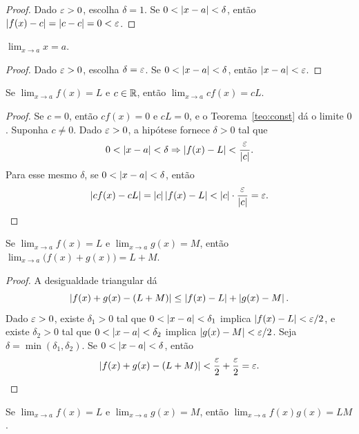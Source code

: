 \documentclass[11pt,a4paper]{article}
\begin{document}
\begin{proof}
Dado $\varepsilon>0$, escolha $\delta=1$. Se $0<\left\lvert x-a \right\rvert<\delta$, ent\~ao $\left\lvert f(x)-c \right\rvert=\left\lvert c-c \right\rvert=0<\varepsilon$.
\end{proof}

\begin{teorema}[Identidade]
\label{teo:id}
$\lim_{x\to a}x=a$.
\end{teorema}

\begin{proof}
Dado $\varepsilon>0$, escolha $\delta=\varepsilon$. Se $0<\left\lvert x-a \right\rvert<\delta$, ent\~ao $\left\lvert x-a \right\rvert<\varepsilon$.
\end{proof}

\begin{teorema}
\label{teo:escalar}
Se $\lim_{x\to a}f(x)=L$ e $c\in\mathbb{R}$, ent\~ao $\lim_{x\to a}cf(x)=cL$.
\end{teorema}

\begin{proof}
Se $c=0$, ent\~ao $cf(x)=0$ e $cL=0$, e o Teorema~\ref{teo:const} d\'a o limite $0$. Suponha $c\neq 0$. Dado $\varepsilon>0$, a hip\'otese fornece $\delta>0$ tal que
\[
0<\left\lvert x-a \right\rvert<\delta \Rightarrow \left\lvert f(x)-L \right\rvert<\frac{\varepsilon}{\left\lvert c \right\rvert}.
\]
Para esse mesmo $\delta$, se $0<\left\lvert x-a \right\rvert<\delta$, ent\~ao
\[
\left\lvert cf(x)-cL \right\rvert=\left\lvert c \right\rvert\left\lvert f(x)-L \right\rvert<\left\lvert c \right\rvert\cdot\frac{\varepsilon}{\left\lvert c \right\rvert}=\varepsilon.
\]
\end{proof}

\begin{teorema}[Soma]
\label{teo:soma}
Se $\lim_{x\to a}f(x)=L$ e $\lim_{x\to a}g(x)=M$, ent\~ao $\lim_{x\to a}\bigl(f(x)+g(x)\bigr)=L+M$.
\end{teorema}

\begin{proof}
A desigualdade triangular d\'a
\[
\left\lvert f(x)+g(x)-(L+M) \right\rvert\le \left\lvert f(x)-L \right\rvert+\left\lvert g(x)-M \right\rvert.
\]
Dado $\varepsilon>0$, existe $\delta_1>0$ tal que $0<\left\lvert x-a \right\rvert<\delta_1$ implica $\left\lvert f(x)-L \right\rvert<\varepsilon/2$, e existe $\delta_2>0$ tal que $0<\left\lvert x-a \right\rvert<\delta_2$ implica $\left\lvert g(x)-M \right\rvert<\varepsilon/2$. Seja $\delta=\min(\delta_1,\delta_2)$. Se $0<\left\lvert x-a \right\rvert<\delta$, ent\~ao
\[
\left\lvert f(x)+g(x)-(L+M) \right\rvert<\frac{\varepsilon}{2}+\frac{\varepsilon}{2}=\varepsilon.
\]
\end{proof}

\begin{teorema}[Produto]
\label{teo:produto}
Se $\lim_{x\to a}f(x)=L$ e $\lim_{x\to a}g(x)=M$, ent\~ao $\lim_{x\to a}f(x)g(x)=LM$.
\end{teorema}
\end{document}
